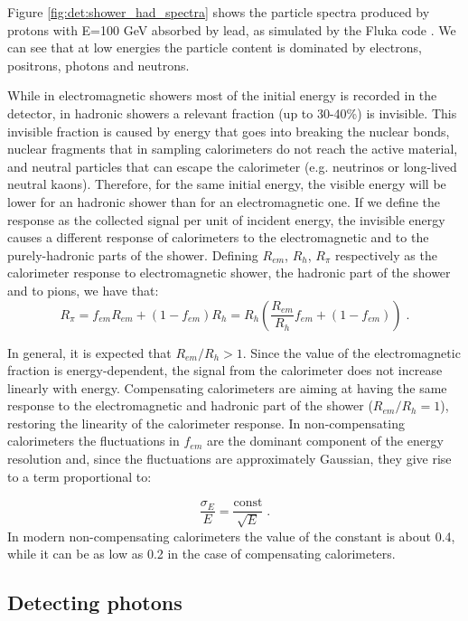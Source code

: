 Figure \ref{fig:det:shower_had_spectra} shows the particle spectra produced by protons with E=100 GeV absorbed by lead, as simulated by the Fluka code \cite{Ferrari:898301}. We can see that at low energies the particle content is dominated by electrons, positrons, photons and neutrons.

While in electromagnetic showers most of the initial energy is recorded in the detector, in hadronic showers a relevant fraction (up to 30-40\%) is invisible. This invisible fraction is caused by energy that goes into breaking the nuclear bonds, nuclear fragments that in sampling calorimeters do not reach the active material, and neutral particles that can escape the calorimeter (e.g. neutrinos or long-lived neutral kaons). Therefore, for the same initial energy, the visible energy will be lower for an hadronic shower than for an electromagnetic one. If we define the response as the collected signal per unit of incident energy, the invisible energy causes a different response of calorimeters to the electromagnetic and to the purely-hadronic parts of the shower. Defining $R_{em}$, $R_{h}$, $R_{\pi}$ respectively as the calorimeter response to electromagnetic shower, the hadronic part of the shower and to pions, we have that:
\begin{equation}
R_{\pi} = f_{em}R_{em} + (1-f_{em}) R_h = R_h \left( \frac{R_{em}}{R_{h}}f_{em} + (1-f_{em})  \right) \; .
\end{equation}

In general, it is expected that $R_{em}/R_{h}>1$. Since the value of the electromagnetic fraction is energy-dependent, the signal from the calorimeter does not increase linearly with energy. Compensating calorimeters are aiming at having the same response to the electromagnetic and hadronic part of the shower ($R_{em}/R_{h}=1$), restoring the linearity of the calorimeter response. In non-compensating calorimeters the fluctuations in $f_{em}$ are the dominant component of the energy resolution and, since the fluctuations are approximately Gaussian,
they give rise to a term proportional to:

\begin{equation}
\frac{\sigma_E}{E} = \frac{\mathrm{const}}{\sqrt{E}}  \; .
\end{equation}
In modern non-compensating calorimeters the value of the constant is about 0.4, while it can be as low as 0.2 in the case of compensating calorimeters.


\subsection{Detecting photons}

